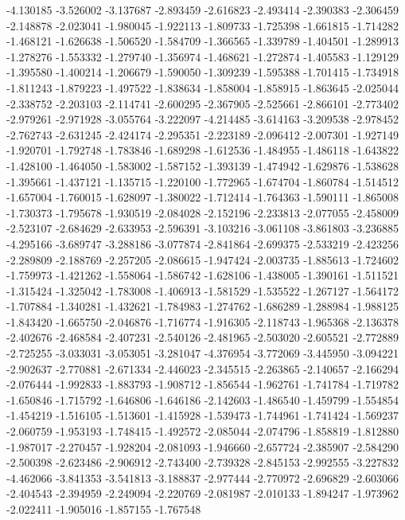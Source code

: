 -4.130185
-3.526002
-3.137687
-2.893459
-2.616823
-2.493414
-2.390383
-2.306459
-2.148878
-2.023041
-1.980045
-1.922113
-1.809733
-1.725398
-1.661815
-1.714282
-1.468121
-1.626638
-1.506520
-1.584709
-1.366565
-1.339789
-1.404501
-1.289913
-1.278276
-1.553332
-1.279740
-1.356974
-1.468621
-1.272874
-1.405583
-1.129129
-1.395580
-1.400214
-1.206679
-1.590050
-1.309239
-1.595388
-1.701415
-1.734918
-1.811243
-1.879223
-1.497522
-1.838634
-1.858004
-1.858915
-1.863645
-2.025044
-2.338752
-2.203103
-2.114741
-2.600295
-2.367905
-2.525661
-2.866101
-2.773402
-2.979261
-2.971928
-3.055764
-3.222097
-4.214485
-3.614163
-3.209538
-2.978452
-2.762743
-2.631245
-2.424174
-2.295351
-2.223189
-2.096412
-2.007301
-1.927149
-1.920701
-1.792748
-1.783846
-1.689298
-1.612536
-1.484955
-1.486118
-1.643822
-1.428100
-1.464050
-1.583002
-1.587152
-1.393139
-1.474942
-1.629876
-1.538628
-1.395661
-1.437121
-1.135715
-1.220100
-1.772965
-1.674704
-1.860784
-1.514512
-1.657004
-1.760015
-1.628097
-1.380022
-1.712414
-1.764363
-1.590111
-1.865008
-1.730373
-1.795678
-1.930519
-2.084028
-2.152196
-2.233813
-2.077055
-2.458009
-2.523107
-2.684629
-2.633953
-2.596391
-3.103216
-3.061108
-3.861803
-3.236885
-4.295166
-3.689747
-3.288186
-3.077874
-2.841864
-2.699375
-2.533219
-2.423256
-2.289809
-2.188769
-2.257205
-2.086615
-1.947424
-2.003735
-1.885613
-1.724602
-1.759973
-1.421262
-1.558064
-1.586742
-1.628106
-1.438005
-1.390161
-1.511521
-1.315424
-1.325042
-1.783008
-1.406913
-1.581529
-1.535522
-1.267127
-1.564172
-1.707884
-1.340281
-1.432621
-1.784983
-1.274762
-1.686289
-1.288984
-1.988125
-1.843420
-1.665750
-2.046876
-1.716774
-1.916305
-2.118743
-1.965368
-2.136378
-2.402676
-2.468584
-2.407231
-2.540126
-2.481965
-2.503020
-2.605521
-2.772889
-2.725255
-3.033031
-3.053051
-3.281047
-4.376954
-3.772069
-3.445950
-3.094221
-2.902637
-2.770881
-2.671334
-2.446023
-2.345515
-2.263865
-2.140657
-2.166294
-2.076444
-1.992833
-1.883793
-1.908712
-1.856544
-1.962761
-1.741784
-1.719782
-1.650846
-1.715792
-1.646806
-1.646186
-2.142603
-1.486540
-1.459799
-1.554854
-1.454219
-1.516105
-1.513601
-1.415928
-1.539473
-1.744961
-1.741424
-1.569237
-2.060759
-1.953193
-1.748415
-1.492572
-2.085044
-2.074796
-1.858819
-1.812880
-1.987017
-2.270457
-1.928204
-2.081093
-1.946660
-2.657724
-2.385907
-2.584290
-2.500398
-2.623486
-2.906912
-2.743400
-2.739328
-2.845153
-2.992555
-3.227832
-4.462066
-3.841353
-3.541813
-3.188837
-2.977444
-2.770972
-2.696829
-2.603066
-2.404543
-2.394959
-2.249094
-2.220769
-2.081987
-2.010133
-1.894247
-1.973962
-2.022411
-1.905016
-1.857155
-1.767548
